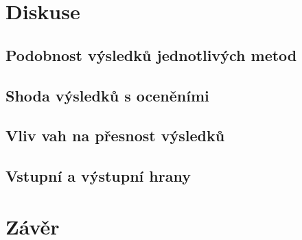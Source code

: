 \documentclass{bakalarka}
\begin{document}
\chapter{Diskuse}
\section{Podobnost výsledků jednotlivých metod}
\section{Shoda výsledků s oceněními}
\section{Vliv vah na přesnost výsledků}
\section{Vstupní a výstupní hrany}

\chapter{Závěr}





\appendix

\newpage
\end{document}
